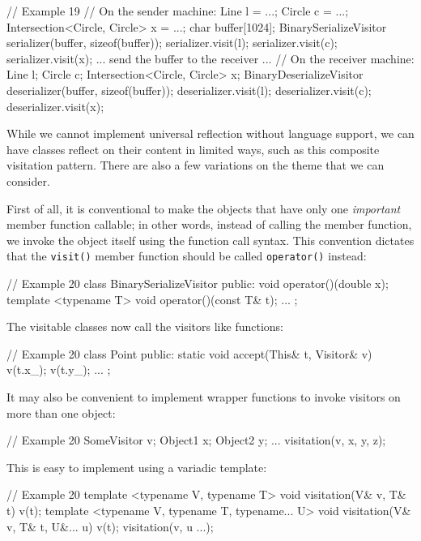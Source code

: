 \begin{code}
// Example 19
// On the sender machine:
Line l = ...;
Circle c = ...;
Intersection<Circle, Circle> x = ...;
char buffer[1024];
BinarySerializeVisitor serializer(buffer, sizeof(buffer));
serializer.visit(l);
serializer.visit(c);
serializer.visit(x);
... send the buffer to the receiver ...
// On the receiver machine:
Line l;
Circle c;
Intersection<Circle, Circle> x;
BinaryDeserializeVisitor deserializer(buffer, 
  sizeof(buffer));
deserializer.visit(l);
deserializer.visit(c);
deserializer.visit(x);
\end{code}

While we cannot implement universal reflection without language support, we can have classes reflect on their content in limited ways, such as this composite visitation pattern. There are also a few variations on the theme that we can consider.

First of all, it is conventional to make the objects that have only one \emph{important} member function callable; in other words, instead of calling the member function, we invoke the object itself using the function call syntax. This convention dictates that the \texttt{visit()} member function should be called \texttt{operator()} instead:

\begin{code}
// Example 20
class BinarySerializeVisitor {
  public:
  void operator()(double x);
  template <typename T> void operator()(const T& t);
  ...
};
\end{code}

The visitable classes now call the visitors like functions:

\begin{code}
// Example 20
class Point {
  public:
  static void accept(This& t, Visitor& v) {
    v(t.x_);
    v(t.y_);
  }
  ...
};
\end{code}

It may also be convenient to implement wrapper functions to invoke visitors on more than one object:

\begin{code}
// Example 20
SomeVisitor v;
Object1 x; Object2 y; ...
visitation(v, x, y, z);
\end{code}

This is easy to implement using a variadic template:

\begin{code}
// Example 20
template <typename V, typename T>
void visitation(V& v, T& t) {
  v(t);
}
template <typename V, typename T, typename... U>
void visitation(V& v, T& t, U&... u) {
  v(t);
  visitation(v, u ...);
}
\end{code}


